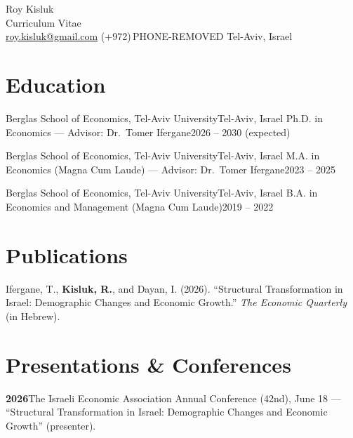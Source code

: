 \documentclass[a4paper, 10pt]{article}
\begin{document}
\begin{center}
  {\Calluna\fontsize{26pt}{26pt}\selectfont Roy Kisluk}\\[4pt]
  {\large Curriculum Vitae}\\[6pt]
  \href{mailto:roy.kisluk@gmail.com}{roy.kisluk@gmail.com} \;\textbullet\;
  (+972)\,PHONE-REMOVED \;\textbullet\; Tel-Aviv, Israel
\end{center}
\vspace{4pt}

\section{Education}
\cventry
{Berglas School of Economics, Tel-Aviv University}{Tel-Aviv, Israel}
{Ph.D. in Economics --- Advisor: Dr.\ Tomer Ifergane}{2026 -- 2030 (expected)}

\cventry
{Berglas School of Economics, Tel-Aviv University}{Tel-Aviv, Israel}
{M.A. in Economics (Magna Cum Laude) --- Advisor: Dr.\ Tomer Ifergane}{2023 -- 2025}

\cventry
{Berglas School of Economics, Tel-Aviv University}{Tel-Aviv, Israel}
{B.A. in Economics and Management (Magna Cum Laude)}{2019 -- 2022}

\section{Publications}
\cvEnum
\item Ifergane, T., \textbf{Kisluk, R.}, and Dayan, I. (2026). ``Structural Transformation in
Israel: Demographic Changes and Economic Growth.'' \textit{The Economic Quarterly} (in Hebrew).
\cvEnumEnd

\section{Presentations \& Conferences}
\cvPlain
\item \textbf{2026}\quad The Israeli Economic Association Annual Conference (42nd), June 18 ---
``Structural Transformation in Israel: Demographic Changes and Economic Growth'' (presenter).
\cvPlainEnd
\end{document}

